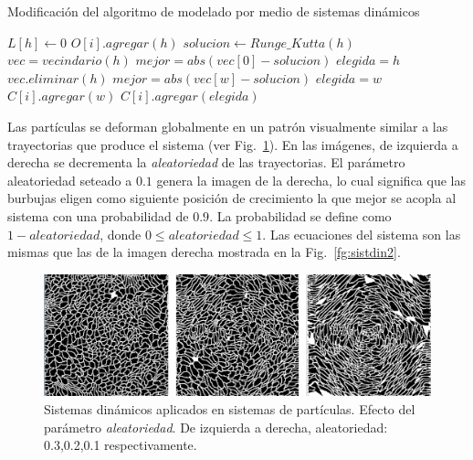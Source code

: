 \begin{algorithm}[h!]
\caption{Modificación del algoritmo de modelado por medio de sistemas dinámicos}
\begin{algorithmic}
\State $L[h]\gets 0$ 
\State $O[i].agregar(h)$
\State $solucion \gets Runge\_Kutta(h)$
\State $vec = vecindario(h)$
\State $mejor = abs(vec[0] - solucion)$
\State $elegida = h$
\State $vec.eliminar(h)$
        \State $mejor = abs(vec[w]-solucion)$
        \State $elegida = w$
    \EndIf
        \State $C[i].agregar(w)$
    \EndIf
\EndFor
{}
\State $C[i].agregar(elegida)$
\end{algorithmic}
\end{algorithm}

Las part\'iculas se deforman globalmente en un patr\'on visualmente similar a las trayectorias que produce el sistema (ver Fig.~\ref{fg:sistdin3}).
En las im\'agenes, de izquierda a derecha se decrementa la {\em aleatoriedad} de las trayectorias.
El par\'ametro aleatoriedad seteado a $0.1$ genera la imagen de la derecha, lo cual significa que las burbujas eligen como siguiente posición de crecimiento la que mejor se acopla al sistema con una probabilidad de $0.9$.
La probabilidad se define como $1-aleatoriedad$, donde $0 \leq aleatoriedad \leq 1$.
Las ecuaciones del sistema son las mismas que las de la imagen derecha mostrada en la Fig.~\ref{fg:sistdin2}.

\begin{figure}[htb!]
  \centerline{\includegraphics[width=13cm]{figures/sistdin3}}
  \caption[Sistemas din\'amicos aplicados en sistemas de part\'iculas]{Sistemas din\'amicos aplicados en sistemas de part\'iculas. Efecto del parámetro {\em aleatoriedad}. De izquierda a derecha, aleatoriedad: 0.3,0.2,0.1 respectivamente. }
  \label{fg:sistdin3}
\end{figure}

